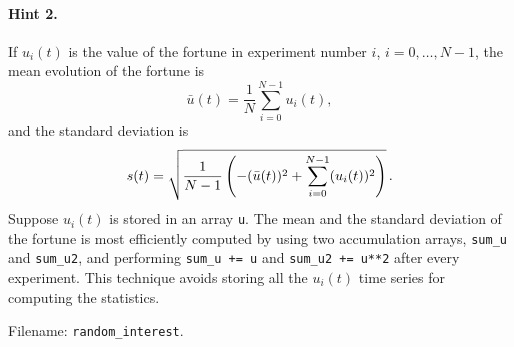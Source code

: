 \documentclass[%
oneside,                 %
final,                   %
10pt]{article}
\newenvironment{doconceexercise}{}{}
\begin{document}
\begin{doconceexercise}
\paragraph{Hint 2.}
If $u_i(t)$ is the value of the fortune in experiment number $i$,
$i=0,\ldots,N-1$,
the mean evolution of the fortune is
\[ \bar u(t)= \frac{1}{N}\sum_{i=0}^{N-1} u_i(t),
\]
and the standard deviation is
\[ s(t) = \sqrt{\frac{1}{N-1}\left(- (\bar u(t))^2 +
                \sum_{i=0}^{N-1} (u_i(t))^2\right)}
\tp
\]
Suppose $u_i(t)$ is stored in an array \texttt{u}.
The mean and the standard deviation of the fortune
is most efficiently computed by
using two accumulation arrays, \Verb!sum_u! and \Verb!sum_u2!, and
performing \Verb!sum_u += u! and \Verb!sum_u2 += u**2! after every experiment.
This technique avoids storing all the $u_i(t)$ time series for
computing the statistics.

\noindent Filename: \Verb!random_interest!.

\end{doconceexercise}
\end{document}

